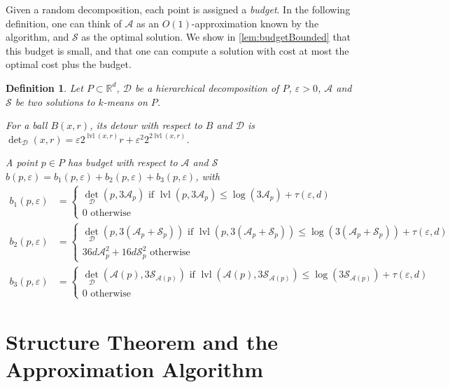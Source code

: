 \documentclass[11pt]{article}
\newtheorem{definition}[theorem]{Definition}
\newcommand{\R}{\mathbb R}
\newcommand{\eps}{\varepsilon}
\newcommand{\calD}{\mathcal {D}}
\newcommand{\calS}{\mathcal {S}}
\newcommand{\calL}{\mathcal{A}}
\newcommand{\offset}{\tau(\eps, d)}
\DeclareMathOperator{\deto}{det}
\newcommand{\lpar}{\left(}
\newcommand{\rpar}{\right)}
\DeclareMathOperator{\level}{lvl}
\newcommand{\david}[1]{\textcolor{orange}{#1}}
\begin{document}
Given a random decomposition, each point is assigned a \emph{budget}. In the following definition, one can think of $\calL$ as an $O(1)$-approximation known by the algorithm, and $\calS$ as the optimal solution. We show in \cref{lem:budgetBounded} that this budget is small, and that one can compute a solution with cost at most the optimal cost plus the budget.

\begin{definition}\label{def:budget}
Let $P\subset \R^d$, $\calD$ be 
a hierarchical decomposition of $P$, $\eps > 0$, $\calL$ and $\calS$ be two 
solutions to $k$-means on $P$. 

For a ball $B(x, r)$, its \emph{detour } with respect to $B$ and $\calD$ is $\deto_\calD(x, r) = \eps 2^{\level(x, r)} r + \eps^2 2^{2\level(x, r)}$.

A point $p\in P$ has \emph{budget} with respect to $\calL$ and $\calS$ $b(p, \eps) = b_1(p, \eps) + b_2(p, \eps) + b_3(p, \eps)$, with
\begin{align*}
    b_1(p, \eps) &= \begin{cases} 
 \deto_\calD(p, 3\calL_p)\text{ if } \level(p, 3\calL_p)\leq \log(3\calL_p) + \offset \\
  0\text{ otherwise }
\end{cases}
\\
b_2(p, \eps) &= \begin{cases} 
\deto_\calD\lpar p, 3(\calL_p + \calS_p)\rpar
 \text{ if } \level(p, 3(\calL_p + \calS_p))\leq \log(3(\calL_p + \calS_p)) + \offset \\
 36 d  \calL_p^2 +  16  d \calS_p^2 \text{ otherwise }
\end{cases}
\\
b_3(p, \eps) &= \begin{cases} 
\deto_\calD(\calL(p),  3\calS_{\calL(p)})
 \text{ if } \level(\calL(p), 3\calS_{\calL(p)})\leq \log(3\calS_{\calL(p)}) + \offset \\
 0 \text{ otherwise }
\end{cases}
\end{align*}
\end{definition}

\section{Structure Theorem and the Approximation    Algorithm}\label{sec:alg}
\end{document}
